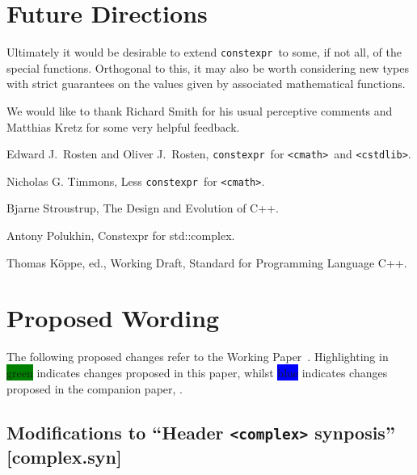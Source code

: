 \documentclass[prd,twocolumn,amsmath,amssymb,nofootinbib,eqsecnum]{revtex4-1}
\newcommand{\constexpr}{\code{constexpr}\xspace}
\newcommand{\code}[1]{{\tt #1}}
\newcommand{\header}[1]{{\tt <#1>}}
\newcommand{\cmath}{\header{cmath}}
\newcommand{\cstdlib}{\header{cstdlib}}
\newcommand{\highlight}[1]{\colorbox{green}{\!\!\!\! #1}}
\newcommand{\oldhighlight}[1]{\colorbox{blue}{\!\!\!\! #1}}
\begin{document}
\section{Future Directions}

Ultimately it would be desirable to extend \constexpr\ to some, if not all, of the special functions. Orthogonal to this, it may also be worth considering new types with strict guarantees on the values given by associated mathematical functions.


\begin{acknowledgments}
	We would like to thank Richard Smith for his usual perceptive comments and Matthias Kretz
	for some very helpful feedback.
\end{acknowledgments}


\begin{thebibliography}{1}
	 Edward J.~Rosten and Oliver J.~Rosten, \constexpr\ for \cmath\ and \cstdlib.

	 Nicholas G. Timmons, Less \constexpr\ for \cmath.
	
	 Bjarne Stroustrup, The Design and Evolution of C++.

	 Antony Polukhin, Constexpr for std::complex.	
		
	 Thomas K\"oppe, ed., Working Draft, Standard for Programming Language C++.	
	
\end{thebibliography}

\newpage

\onecolumngrid

\section{Proposed Wording}

\setlength{\parindent}{0pt}


The following proposed changes refer to the Working Paper~\cite{WorkingPaper}. Highlighting in \highlight{green} indicates changes proposed in this paper, whilst \oldhighlight{blue} indicates changes proposed in the companion paper, \cite{Rosten-constexpr}.



\subsection{Modifications to ``Header \header{complex} synposis'' [complex.syn]}
\end{document}

